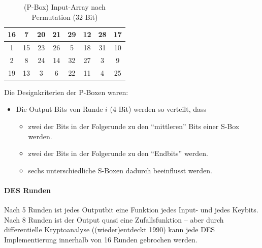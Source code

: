 \begin{table}[h]
    \centering
    \begin{tabular}{|*{8}{c|}}
        \hline
        \cellcolor{orange-1}16 & \cellcolor{red-1}7 & \cellcolor{yellow-1}20 & \cellcolor{yellow-1}21 & 
        \cellcolor{green-1}29 & \cellcolor{orange-1}12 & \cellcolor{green-1}28 & \cellcolor{yellow-1}17 \\
        \hline 
        \cellcolor{red-1}1 & \cellcolor{orange-1}15 & \cellcolor{yellow-1}23 & \cellcolor{green-1}26 & 
        \cellcolor{red-1}5 & \cellcolor{yellow-1}18 & \cellcolor{green-1}31 & \cellcolor{orange-1}10 \\
        \hline 
        \cellcolor{red-1}2 & \cellcolor{red-1}8 & \cellcolor{yellow-1}24 & \cellcolor{orange-1}14 & 
        \cellcolor{green-1}32 & \cellcolor{green-1}27 & \cellcolor{red-1}3 & \cellcolor{orange-1}9 \\
        \hline
        \cellcolor{yellow-1}19 & \cellcolor{orange-1}13 & \cellcolor{red-1}3 & \cellcolor{red-1}6 &
        \cellcolor{yellow-1}22 & \cellcolor{orange-1}11 & \cellcolor{red-1}4 & \cellcolor{green-1}25 \\
        \hline
    \end{tabular}
    \caption{(P-Box) Input-Array nach Permutation (32 Bit)}
\end{table}

Die Designkriterien der P-Boxen waren:

\begin{itemize}
    \item Die Output Bits von Runde $i$ (4 Bit) werden so verteilt, dass
    \begin{itemize}
        \item zwei der Bits in der Folgerunde zu den ``mittleren'' Bits einer S-Box werden. 
        \item zwei der Bits in der Folgerunde zu den ``Endbits'' werden. 
        \item sechs unterschiedliche S-Boxen dadurch beeinflusst werden.
    \end{itemize}
\end{itemize}

\paragraph{DES Runden}

Nach 5 Runden ist jedes Outputbit eine Funktion jedes Input- und jedes Keybits. \\
Nach 8 Runden ist der Output quasi eine Zufallsfunktion -- aber durch differentielle Kryptoanalyse ((wieder)entdeckt 1990)
kann jede DES Implementierung innerhalb von 16 Runden gebrochen werden. 

